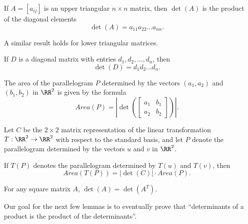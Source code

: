 \begin{theorem}
  If $A = \left[a_{ij}\right]$ is an upper triangular $n \times n$ matrix, then $\det(A)$ is the product of the diagonal elements
  \begin{equation*}
    \det(A) = a_{11}a_{22} \dots a_{nn}.
  \end{equation*}
\end{theorem}

A similar result holds for lower triangular matrices.

\begin{corollary}
  If $D$ is a diagonal matrix with entries $d_{1}, d_{2}, \dots, d_{n}$, then
  \begin{equation*}
    \det(D) = d_{1}d_{2} \dots d_{n}.
  \end{equation*}
\end{corollary}

\begin{theorem}
  The area of the parallelogram $P$ determined by the vectors $(a_{1}, a_{2})$ and $(b_{1}, b_{2})$ in $\RR^{2}$ is given by the formula
  \begin{equation*}
    Area(P) = \left|\det \left( \begin{bmatrix} a_{1} & b_{1} \\ a_{2} & b_{2}\end{bmatrix} \right)\right|.
  \end{equation*}
\end{theorem}

\begin{theorem}
  Let $C$ be the $2 \times 2$ matrix representation of the linear transformation $T : \RR^{2} \to \RR^{2}$ with respect to the standard basis, and let $P$ denote
  the parallelogram determined by the vectors $u$ and $v$ in $\RR^{2}$.

  If $T(P)$ denotes the parallelogram determined by $T(u)$ and $T(v)$, then
  \begin{equation*}
    Area(T(P)) = \left|\det(C)\right| \cdot Area(P).
  \end{equation*}
\end{theorem}

\begin{theorem}
  For any square matrix $A$, $\det(A) = \det(A^{T})$.
\end{theorem}

\begin{remark}
  Our goal for the next few lemmas is to eventually prove that ``determinants of a product is the product of the determinants''.
\end{remark}

